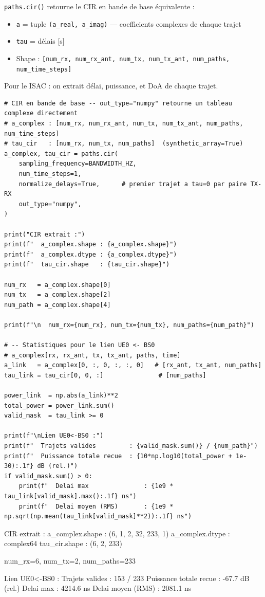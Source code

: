 \documentclass[11pt,a4paper]{article}
\begin{document}
\texttt{paths.cir()} retourne le CIR en bande de base équivalente :
\begin{itemize}
    \item \texttt{a} = tuple \texttt{(a\_real, a\_imag)} --- coefficients complexes de chaque trajet
    \item \texttt{tau} = délais [s]
    \item Shape : \texttt{[num\_rx, num\_rx\_ant, num\_tx, num\_tx\_ant, num\_paths, num\_time\_steps]}
\end{itemize}
Pour le ISAC : on extrait délai, puissance, et DoA de chaque trajet.

\begin{lstlisting}
# CIR en bande de base -- out_type="numpy" retourne un tableau complexe directement
# a_complex : [num_rx, num_rx_ant, num_tx, num_tx_ant, num_paths, num_time_steps]
# tau_cir   : [num_rx, num_tx, num_paths]  (synthetic_array=True)
a_complex, tau_cir = paths.cir(
    sampling_frequency=BANDWIDTH_HZ,
    num_time_steps=1,
    normalize_delays=True,      # premier trajet a tau=0 par paire TX-RX
    out_type="numpy",
)

print("CIR extrait :")
print(f"  a_complex.shape : {a_complex.shape}")
print(f"  a_complex.dtype : {a_complex.dtype}")
print(f"  tau_cir.shape   : {tau_cir.shape}")

num_rx   = a_complex.shape[0]
num_tx   = a_complex.shape[2]
num_path = a_complex.shape[4]

print(f"\n  num_rx={num_rx}, num_tx={num_tx}, num_paths={num_path}")

# -- Statistiques pour le lien UE0 <- BS0
# a_complex[rx, rx_ant, tx, tx_ant, paths, time]
a_link   = a_complex[0, :, 0, :, :, 0]   # [rx_ant, tx_ant, num_paths]
tau_link = tau_cir[0, 0, :]               # [num_paths]

power_link  = np.abs(a_link)**2
total_power = power_link.sum()
valid_mask  = tau_link >= 0

print(f"\nLien UE0<-BS0 :")
print(f"  Trajets valides         : {valid_mask.sum()} / {num_path}")
print(f"  Puissance totale recue  : {10*np.log10(total_power + 1e-30):.1f} dB (rel.)")
if valid_mask.sum() > 0:
    print(f"  Delai max               : {1e9 * tau_link[valid_mask].max():.1f} ns")
    print(f"  Delai moyen (RMS)       : {1e9 * np.sqrt(np.mean(tau_link[valid_mask]**2)):.1f} ns")
\end{lstlisting}

\begin{consoleout}
CIR extrait :
  a_complex.shape : (6, 1, 2, 32, 233, 1)
  a_complex.dtype : complex64
  tau_cir.shape   : (6, 2, 233)

  num_rx=6, num_tx=2, num_paths=233

Lien UE0<-BS0 :
  Trajets valides         : 153 / 233
  Puissance totale recue  : -67.7 dB (rel.)
  Delai max               : 4214.6 ns
  Delai moyen (RMS)       : 2081.1 ns
\end{consoleout}
\end{document}

